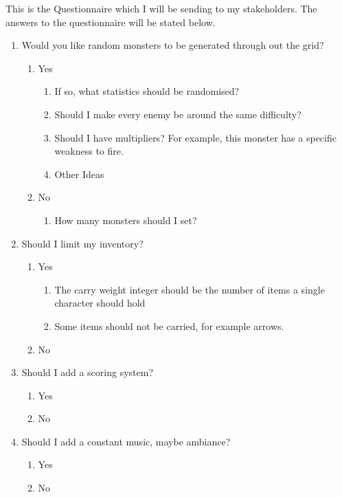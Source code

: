 \documentclass[12pt]{article}
\begin{document}
This is the Questionnaire which I will be sending to my stakeholders. The answers to the questionnaire will be stated below.

\begin{enumerate}
	\item{Would you like random monsters to be generated through out the grid?}
		\begin{enumerate}
		\item Yes
			\begin{enumerate}
				\item If so, what statistics should be randomised?
				\item Should I make every enemy be around the same difficulty?
				\item Should I have multipliers? For example, this monster has a specific weakness to fire.
				\item Other Ideas
			\end{enumerate}
		\item No
			\begin{enumerate}
				\item How many monsters should I set?
			\end{enumerate}
		\end{enumerate}

			
	\item{Should I limit my inventory?}
		\begin{enumerate}
		\item Yes
			\begin{enumerate}
				\item The carry weight integer should be the number of items a single character should hold
				\item Some items should not be carried, for example arrows. 
			\end{enumerate}
		\item No
		\end{enumerate}
			
	\item{Should I add a scoring system?}
		\begin{enumerate}
		\item Yes
		\item No
		\end{enumerate}
			
	\item{Should I add a constant music, maybe ambiance?}
		\begin{enumerate}
		\item Yes
		\item No
		\end{enumerate}
				

\end{enumerate}
\end{document}
